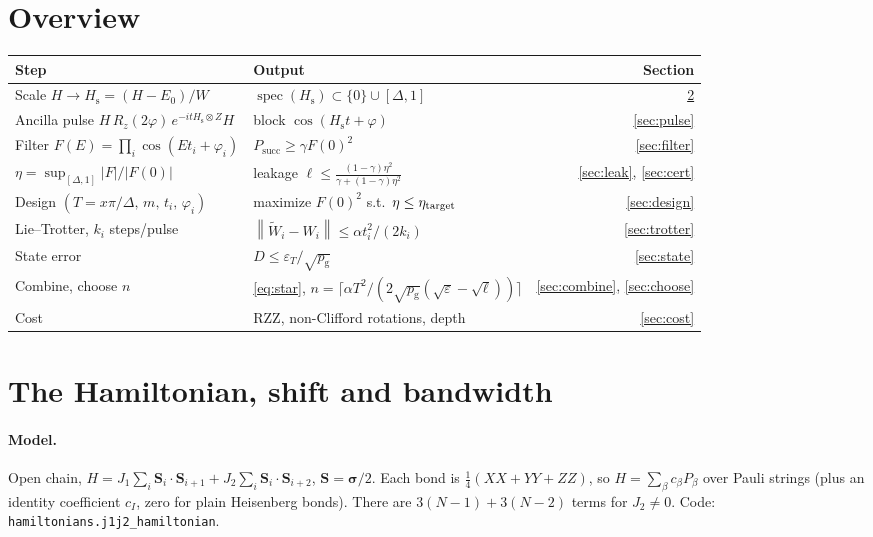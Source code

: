 \documentclass[11pt]{article}
\theoremstyle{definition}
\newcommand{\norm}[1]{\left\lVert #1\right\rVert}
\newcommand{\abs}[1]{\left\lvert #1\right\rvert}
\newcommand{\Hs}{H_{\mathrm s}}
\newcommand{\eps}{\varepsilon}
\newcommand{\pg}{p_{\mathrm g}}
\newcommand{\code}[1]{\texttt{#1}}
\begin{document}
\section{Overview}
\begin{center}
\small
\begin{tabular}{@{}ll r@{}}
\toprule
Step & Output & Section\\
\midrule
Scale $H\to \Hs=(H-E_0)/W$ & $\operatorname{spec}(\Hs)\subset\{0\}\cup[\Delta,1]$ & \ref{sec:scale}\\
Ancilla pulse $H\,R_z(2\varphi)\,e^{-it\Hs\otimes Z}H$ & block $\cos(\Hs t+\varphi)$ & \ref{sec:pulse}\\
Filter $F(E)=\prod_i\cos(Et_i+\varphi_i)$ & $P_{\mathrm{succ}}\ge\gamma F(0)^2$ & \ref{sec:filter}\\
$\eta=\sup_{[\Delta,1]}\abs{F}/\abs{F(0)}$ & leakage $\ell\le\frac{(1-\gamma)\eta^2}{\gamma+(1-\gamma)\eta^2}$ & \ref{sec:leak}, \ref{sec:cert}\\
Design $(T=x\pi/\Delta,\,m,\,t_i,\,\varphi_i)$ & maximize $F(0)^2$ s.t.\ $\eta\le\eta_{\rm target}$ & \ref{sec:design}\\
Lie--Trotter, $k_i$ steps/pulse & $\norm{\tilde W_i-W_i}\le\alpha t_i^2/(2k_i)$ & \ref{sec:trotter}\\
State error & $D\le\eps_T/\sqrt{\pg}$ & \ref{sec:state}\\
Combine, choose $n$ & \eqref{eq:star}, $n=\lceil \alpha T^2/(2\sqrt{\pg}(\sqrt\eps-\sqrt\ell))\rceil$ & \ref{sec:combine}, \ref{sec:choose}\\
Cost & RZZ, non-Clifford rotations, depth & \ref{sec:cost}\\
\bottomrule
\end{tabular}
\end{center}

\section{The Hamiltonian, shift and bandwidth}\label{sec:scale}
\paragraph{Model.} Open chain, $H=J_1\sum_i \mathbf S_i\!\cdot\!\mathbf S_{i+1}+J_2\sum_i\mathbf S_i\!\cdot\!\mathbf S_{i+2}$,
$\mathbf S=\boldsymbol\sigma/2$. Each bond is $\tfrac14(XX+YY+ZZ)$, so $H=\sum_\beta c_\beta P_\beta$ over Pauli strings
(plus an identity coefficient $c_I$, zero for plain Heisenberg bonds). There are $3(N-1)+3(N-2)$ terms for $J_2\neq0$.
Code: \code{hamiltonians.j1j2\_hamiltonian}.
\end{document}
